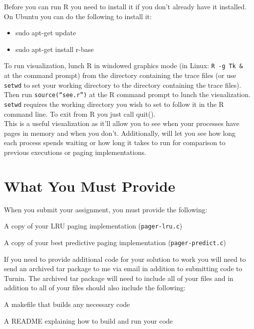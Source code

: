 \documentclass[12pt]{article}
\newenvironment{packed_enum}{
\begin{enumerate}
  \setlength{\itemsep}{1pt}
  \setlength{\parskip}{0pt}
  \setlength{\parsep}{0pt}
}{\end{enumerate}}
\begin{document}
\begin{packed_enum}
  Before you can run R you need to install it if you don't already have it installed. 
  On Ubuntu you can do the following to install it:
  \begin{itemize}
  \item sudo apt-get update
  \item sudo apt-get install r-base
  \end{itemize}
  To run visualization, lunch R in
  windowed graphics mode (in Linux: \texttt{R -g Tk \&} at the command
  prompt) from the directory containing the trace
  files (or use \texttt{setwd} to set your working directory to the directory
  containing the trace files). Then run \texttt{source(``see.r'')} at the R
  command prompt to lunch the visualization.\\
  
  \texttt{setwd} requires the working directory you wish to set to follow it in the R command line. To exit from R you just call quit(). \\
  
  This is a useful visualization as it'll allow you to see when your processes have pages in memory and when you don't. Additionally, will let you see how long each process spends waiting or how long it takes to run for comparison to previous executions or paging implementations. 
  
\end{packed_enum}

\section{What You Must Provide}

When you submit your assignment, you must provide the following:
\begin{packed_enum}
\item A copy of your LRU paging implementation (\texttt{pager-lru.c})
\item A copy of your best predictive paging implementation (\texttt{pager-predict.c})
\end{packed_enum}

If you need to provide additional code for your solution to work you will need to send an archived tar package to me via email in addition to submitting code to Turnin. The archived tar package will need to include all of your files and in addition to all of your files should also include the following:
\begin{packed_enum}
\item A makefile that builds any necessary code
\item A README explaining how to build and run your code
\end{packed_enum}
\end{document}
